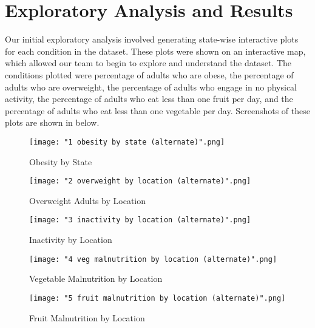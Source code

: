 \documentclass{article}
\begin{document}
	\section{Exploratory Analysis and Results}
		\label{results}
		Our initial exploratory analysis involved generating state-wise interactive plots for each condition in the dataset. These plots were shown on an interactive map, which allowed our team to begin to explore and understand the dataset. The conditions plotted were percentage of adults who are obese, the percentage of adults who are overweight, the percentage of adults who engage in no physical activity, the percentage of adults who eat less than one fruit per day, and the percentage of adults who eat less than one vegetable per day. Screenshots of these plots are shown in  below. 
		\begin{figure}[h]
			\centering
			\caption{Obesity by State}
			\texttt{[image: "1 obesity by state (alternate)".png]}
			\label{fig:obesityByState}
		\end{figure}
		\begin{figure}[h]
			\centering
			\caption{Overweight Adults by Location}
			\texttt{[image: "2 overweight by location (alternate)".png]}
			\label{fig:overweightAdultsByLocation}
		\end{figure}
		\begin{figure}[h]
			\centering
			\caption{Inactivity by Location}
			\texttt{[image: "3 inactivity by location (alternate)".png]}
			\label{fig:inactivityByLocation}
		\end{figure}
		\begin{figure}[h]
			\centering
			\caption{Vegetable Malnutrition by Location}
			\texttt{[image: "4 veg malnutrition by location (alternate)".png]}
			\label{fig:vegetableMalnutritionByLocation}
		\end{figure}
		\begin{figure}[h]
			\centering
			\caption{Fruit Malnutrition by Location}
			\texttt{[image: "5 fruit malnutrition by location (alternate)".png]}
			\label{fig:fruitMalnutritionByLocation}
		\end{figure}
\end{document}
